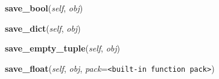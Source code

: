     \label{pickle:Pickler:save_bool}

    \vspace{0.5ex}

\hspace{.8\funcindent}\begin{boxedminipage}{\funcwidth}

    \raggedright \textbf{save\_bool}(\textit{self}, \textit{obj})

\setlength{\parskip}{2ex}
\setlength{\parskip}{1ex}
    \end{boxedminipage}

    \label{pickle:Pickler:save_dict}

    \vspace{0.5ex}

\hspace{.8\funcindent}\begin{boxedminipage}{\funcwidth}

    \raggedright \textbf{save\_dict}(\textit{self}, \textit{obj})

\setlength{\parskip}{2ex}
\setlength{\parskip}{1ex}
    \end{boxedminipage}

    \label{pickle:Pickler:save_empty_tuple}

    \vspace{0.5ex}

\hspace{.8\funcindent}\begin{boxedminipage}{\funcwidth}

    \raggedright \textbf{save\_empty\_tuple}(\textit{self}, \textit{obj})

\setlength{\parskip}{2ex}
\setlength{\parskip}{1ex}
    \end{boxedminipage}

    \label{pickle:Pickler:save_float}

    \vspace{0.5ex}

\hspace{.8\funcindent}\begin{boxedminipage}{\funcwidth}

    \raggedright \textbf{save\_float}(\textit{self}, \textit{obj}, \textit{pack}={\tt {\textless}built-in function pack{\textgreater}})

\setlength{\parskip}{2ex}
\setlength{\parskip}{1ex}
    \end{boxedminipage}

